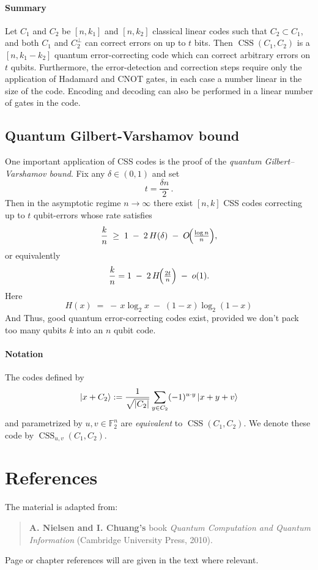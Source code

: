 \documentclass[11pt,a4paper]{article}
\theoremstyle{definition}
\theoremstyle{plain}
\theoremstyle{remark}
\begin{document}
\paragraph{Summary} 
Let $C_1$ and $C_2$ be $[n, k_1]$ and $[n, k_2]$ classical linear codes such that $C_2 \subset C_1$, and both $C_1$ and $C_2^\perp$ can correct errors on up to $t$ bits. 
Then $\operatorname{CSS}(C_1, C_2)$ is a $[n, k_1 - k_2]$ quantum error-correcting code which can correct arbitrary errors on $t$ qubits. 
Furthermore, the error-detection and correction steps require only the application of Hadamard and CNOT gates, in each case a number linear in the size of the code. Encoding and decoding can also be performed in a linear number 
of gates in the code. 

\subsection{Quantum Gilbert-Varshamov bound} 
One important application of CSS codes is the proof of the \emph{quantum Gilbert–Varshamov bound}.  Fix any \(\delta\in(0,1)\) and set 
\[
t = \frac{\delta n}{2}\,.
\]
Then in the asymptotic regime \(n\to\infty\) there exist \([n,k]\) CSS codes correcting up to \(t\) qubit-errors whose rate satisfies
\[
\frac{k}{n}
\;\ge\;
1 \;-\; 2\,H(\delta)
\;-\;
O\!\Bigl(\tfrac{\log n}{n}\Bigr),
\]
or equivalently
\[
\frac{k}{n}
=
1 \;-\; 2\,H\!\Bigl(\tfrac{2t}{n}\Bigr)
\;-\;
o(1).
\]
Here 
\[
H(x) \;=\; -\,x\log_{2}x \;-\;(1-x)\log_{2}(1-x)
\] 
And Thus, good quantum error-correcting codes exist, provided we don't pack too many qubits $k$ into an $n$ qubit code. 


\paragraph{Notation} 
The codes defined by 
$$\ket{x + C_2} := \frac{1}{\sqrt{|C_2|}} \sum_{y \in C_2} (-1)^{u \cdot y} \ket{x + y + v}$$
and parametrized by $u, v \in \mathbb{F}_2^n$ are \emph{equivalent} to $\operatorname{CSS}(C_1, C_2)$. 
We denote these code by $\operatorname{CSS}_{u, v}(C_1, C_2)$. 


\section{References}
The material is adapted from: 
\begin{quote}
\textbf{A. Nielsen and I. Chuang's} book \emph{Quantum Computation and Quantum Information} (Cambridge University Press, 2010).
\end{quote}
Page or chapter references will are given in the text where relevant. 
\end{document}
